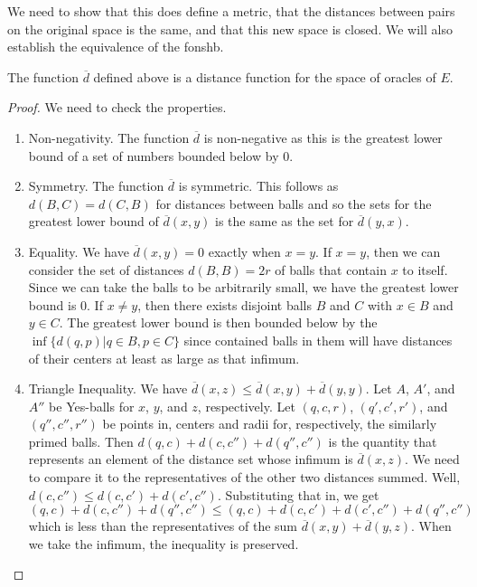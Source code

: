 We need to show that this does define a metric, that the distances between pairs on the original space is the same, and that this new space is closed. We will also establish the equivalence of the fonshb. 

\begin{proposition}
    The function $\overline{d}$ defined above is a distance function for the space of oracles of $E$. 
\end{proposition}

\begin{proof}
We need to check the properties. 
\begin{enumerate}
\item Non-negativity. The function $\overline{d}$ is non-negative as this is the greatest lower bound of a set of numbers bounded below by 0. 
\item Symmetry. The function $\overline{d}$ is symmetric. This follows as $d(B,C) = d(C,B)$ for distances between balls and so the sets for the greatest lower bound of $\overline{d}(x,y)$ is the same as the set for $\overline{d}(y,x)$.
\item Equality. We have $\overline{d}(x,y) = 0$ exactly when $x=y$. If $x=y$, then we can consider the set of distances $d(B,B)= 2r$ of balls that contain $x$ to itself. Since we can take the balls to be arbitrarily small, we have the greatest lower bound is 0. If $x \neq y$, then there exists disjoint balls $B$ and $C$ with $x \in B$ and $y \in C$. The greatest lower bound is then bounded below by the $\inf\{d(q,p) | q \in B, p \in C\}$ since contained balls in them will have distances of their centers at least as large as that infimum. 
\item Triangle Inequality. We have $\overline{d}(x,z) \leq \overline{d}(x,y) + \overline{d}(y,y)$. Let $A$, $A'$, and $A''$ be Yes-balls for $x$, $y$, and $z$, respectively. Let $(q,c, r)$, $(q',c', r')$, and $(q'', c'', r'')$ be points in, centers and radii for, respectively, the similarly primed balls. Then $d(q,c) + d(c, c'') + d(q'',c'')$ is the quantity that represents an element of the distance set whose infimum is $\overline{d}(x,z)$. We need to compare it to the representatives of the other two distances summed. Well, $d(c,c'') \leq d(c,c') + d(c', c'')$. Substituting that in, we get $(q,c) + d(c, c'') + d(q'',c'') \leq (q,c) + d(c,c') + d(c', c'') + d(q'',c'')$ which is less than the representatives of the sum $\overline{d}(x,y) + \overline{d}(y,z)$. When we take the infimum, the inequality is preserved. 
\end{enumerate}
\end{proof}


